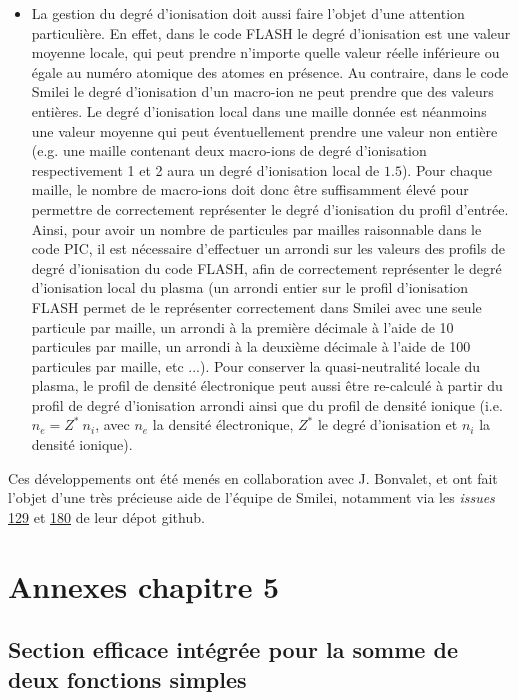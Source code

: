 \begin{itemize}
    \item La gestion du degré d'ionisation doit aussi faire l'objet d'une attention particulière. En effet, dans le code FLASH le degré d'ionisation est une valeur moyenne locale, qui peut prendre n'importe quelle valeur réelle inférieure ou égale au numéro atomique des atomes en présence. Au contraire, dans le code Smilei le degré d'ionisation d'un macro-ion ne peut prendre que des valeurs entières. Le degré d'ionisation local dans une maille donnée est néanmoins une valeur moyenne qui peut éventuellement prendre une valeur non entière (e.g. une maille contenant deux macro-ions de degré d'ionisation respectivement 1 et 2 aura un degré d'ionisation local de $1.5$). Pour chaque maille, le nombre de macro-ions doit donc être suffisamment élevé pour permettre de correctement représenter le degré d'ionisation du profil d'entrée. Ainsi, pour avoir un nombre de particules par mailles raisonnable dans le code PIC, il est nécessaire d'effectuer un arrondi sur les valeurs des profils de degré d'ionisation du code FLASH, afin de correctement représenter le degré d'ionisation local du plasma (un arrondi entier sur le profil d'ionisation FLASH permet de le représenter correctement dans Smilei avec une seule particule par maille, un arrondi à la première décimale à l'aide de 10 particules par maille, un arrondi à la deuxième décimale à l'aide de 100 particules par maille, etc ...). Pour conserver la quasi-neutralité locale du plasma, le profil de densité électronique peut aussi être re-calculé à partir du profil de degré d'ionisation arrondi ainsi que du profil de densité ionique (i.e. $n_e = Z^* ~  n_i$, avec $n_e$ la densité électronique, $Z^*$ le degré d'ionisation et $n_i$ la densité ionique).
\end{itemize}

Ces développements ont été menés en collaboration avec J. Bonvalet, et ont fait l'objet d'une très précieuse aide de l'équipe de Smilei, notamment via les \textit{issues} \href{https://github.com/SmileiPIC/Smilei/issues/129}{129} et \href{https://github.com/SmileiPIC/Smilei/issues/180}{180} de leur dépot github.

\chapter{Annexes chapitre 5}
\section{Section efficace intégrée pour la somme de deux fonctions simples}
\label{an:5-somme_2_fonctions}

